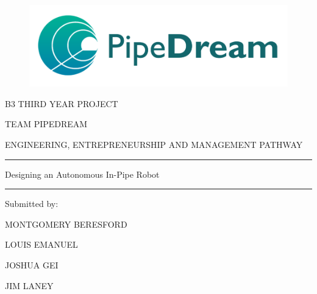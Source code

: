 \documentclass[11pt]{article}		%
\begin{document}
	
	\flushleft
	\raggedright

	\begin{center}
	
		\vspace*{1cm}
		
		\begin{figure}
			\centering
			\includegraphics[width=\textwidth]{PipeDreamLogo}
		\end{figure}
						
		\vspace*{-2cm}
		
		\fontsize{20pt}{22pt}\selectfont
		B3 THIRD YEAR PROJECT
		
		TEAM PIPEDREAM
		
		\vspace*{1cm}
		
		\fontsize{12pt}{14pt}\selectfont		
		ENGINEERING, ENTREPRENEURSHIP AND MANAGEMENT PATHWAY
		
		\vspace*{1.5cm}
		
		\rule{0.95\textwidth}{1pt}

		\fontsize{22pt}{24pt}\selectfont
		Designing an Autonomous In-Pipe Robot
		\vspace*{-1cm}
		\rule{0.95\textwidth}{1pt}
				
		\vspace*{1.5cm}
				
		\fontsize{12pt}{14pt}\selectfont
		Submitted by:
		
		\fontsize{14pt}{16pt}\selectfont
		MONTGOMERY BERESFORD
		
		LOUIS EMANUEL
		
		JOSHUA GEI
		
		JIM LANEY
		
		\fontsize{11pt}{\baselineskip}\selectfont
		\thispagestyle{empty} %
	\end{center}

	\newpage
	
	\pagestyle{empty}
	
	\setlength{\headheight}{18pt}
	
\end{document}

